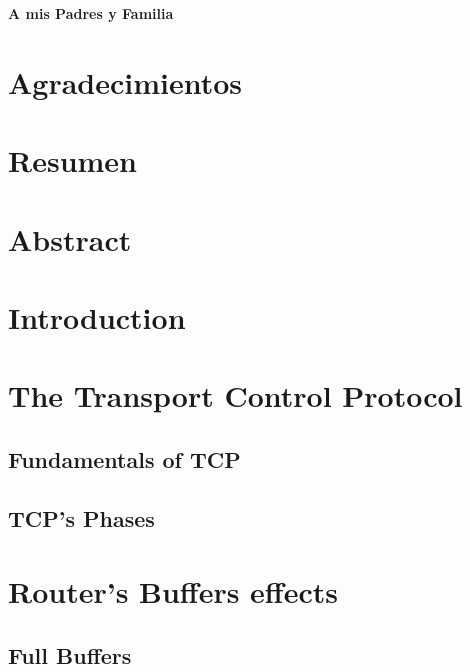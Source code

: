 \documentclass[letter, 11pt]{article}
\theoremstyle{plain}
\theoremstyle{definition}
\begin{document}



\newpage
\vspace*{6 cm}
\hfill\textbf{A mis Padres y Familia}
\newpage
\section*{Agradecimientos}


\newpage
\section*{Resumen}

\newpage
\section*{Abstract}

\newpage
\printglossary

\newpage
\tableofcontents
\listoffigures
\listoftables

\newpage

\doublespacing
\section{Introduction}


\newpage

\section{The Transport Control Protocol}


\subsection{Fundamentals of TCP}


\subsection{TCP's Phases }


\newpage

\section{Router's Buffers effects}

\subsection{Full Buffers}

\end{document}
